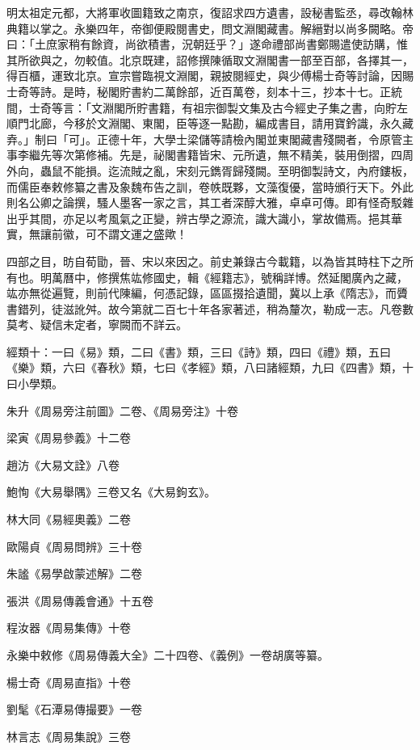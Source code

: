 

明太祖定元都，大將軍收圖籍致之南京，復詔求四方遺書，設秘書監丞，尋改翰林典籍以掌之。永樂四年，帝御便殿閱書史，問文淵閣藏書。解縉對以尚多闕略。帝曰：「土庶家稍有餘資，尚欲積書，況朝廷乎？」遂命禮部尚書鄭賜遣使訪購，惟其所欲與之，勿較值。北京既建，詔修撰陳循取文淵閣書一部至百部，各擇其一，得百櫃，運致北京。宣宗嘗臨視文淵閣，親披閱經史，與少傅楊士奇等討論，因賜士奇等詩。是時，秘閣貯書約二萬餘部，近百萬卷，刻本十三，抄本十七。正統間，士奇等言：「文淵閣所貯書籍，有祖宗御製文集及古今經史子集之書，向貯左順門北廊，今移於文淵閣、東閣，臣等逐一點勘，編成書目，請用寶鈐識，永久藏弆。」制曰「可」。正德十年，大學士梁儲等請檢內閣並東閣藏書殘闕者，令原管主事李繼先等次第修補。先是，祕閣書籍皆宋、元所遺，無不精美，裝用倒摺，四周外向，蟲鼠不能損。迄流賊之亂，宋刻元鐫胥歸殘闕。至明御製詩文，內府鏤板，而儒臣奉敕修纂之書及象魏布告之訓，卷帙既夥，文藻復優，當時頒行天下。外此則名公卿之論撰，騷人墨客一家之言，其工者深醇大雅，卓卓可傳。即有怪奇駁雜出乎其間，亦足以考風氣之正變，辨古學之源流，識大識小，掌故備焉。挹其華實，無讓前徽，可不謂文運之盛歟！

四部之目，昉自荀勖，晉、宋以來因之。前史兼錄古今載籍，以為皆其時柱下之所有也。明萬曆中，修撰焦竑修國史，輯《經籍志》，號稱詳博。然延閣廣內之藏，竑亦無從遍覽，則前代陳編，何憑記錄，區區掇拾遺聞，冀以上承《隋志》，而贗書錯列，徒滋訛舛。故今第就二百七十年各家著述，稍為釐次，勒成一志。凡卷數莫考、疑信未定者，寧闕而不詳云。

經類十：一曰《易》類，二曰《書》類，三曰《詩》類，四曰《禮》類，五曰《樂》類，六曰《春秋》類，七曰《孝經》類，八曰諸經類，九曰《四書》類，十曰小學類。

朱升《周易旁注前圖》二卷、《周易旁注》十卷

梁寅《周易參義》十二卷

趙汸《大易文詮》八卷

鮑恂《大易舉隅》三卷又名《大易鉤玄》。

林大同《易經奧義》二卷

歐陽貞《周易問辨》三十卷

朱謐《易學啟蒙述解》二卷

張洪《周易傳義會通》十五卷

程汝器《周易集傳》十卷

永樂中敕修《周易傳義大全》二十四卷、《義例》一卷胡廣等纂。

楊士奇《周易直指》十卷

劉髦《石潭易傳撮要》一卷

林言志《周易集說》三卷


